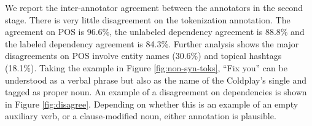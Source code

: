\documentclass[11pt,a4paper]{article}
\newcommand{\yjcomment}[1]{\textcolor{orange}{[$_\mathrm{L}^\mathrm{Y}$#1]}}
\newcommand{\nascomment}[1]{\textcolor{blue}{[#1 ---\textsc{nas}]}}
\newcommand{\yicomment}[1]{\textcolor{gray}{[#1 ---\textsc{yi}]}}
\begin{document}
We report the inter-annotator agreement between the annotators
in the second stage. There is very little disagreement on the
tokenization annotation. %
The agreement on POS is 96.6\%, the unlabeled
dependency agreement is 88.8\% and the labeled dependency agreement
is 84.3\%. Further analysis shows the major disagreements on POS
involve entity names (30.6\%) %
and topical hashtags (18.1\%).
Taking the example in Figure \ref{fig:non-syn-toks}, ``Fix you'' 
can
be understood as a verbal phrase but also as the name of the Coldplay's
single and tagged as proper noun. 
An example of a disagreement on
dependencies is shown in Figure \ref{fig:disagree}.  Depending on
whether this is an example of an empty auxiliary verb, or a clause-modified
noun, either annotation is plausible.
\end{document}
